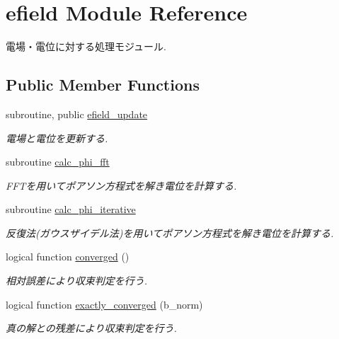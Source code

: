 \hypertarget{classefield}{\section{efield Module Reference}
\label{classefield}
}


電場・電位に対する処理モジュール.  


\subsection*{Public Member Functions}
\begin{DoxyCompactItemize}
\item 
\hypertarget{classefield_aa3e1da626e85f46b666ff7edf547aea5}{subroutine, public \hyperlink{classefield_aa3e1da626e85f46b666ff7edf547aea5}{efield\-\_\-update}}\label{classefield_aa3e1da626e85f46b666ff7edf547aea5}

\begin{DoxyCompactList}\small\item\em 電場と電位を更新する. \end{DoxyCompactList}\item 
\hypertarget{classefield_ac528cd9ba637bdbf306ab48e7d26b5af}{subroutine \hyperlink{classefield_ac528cd9ba637bdbf306ab48e7d26b5af}{calc\-\_\-phi\-\_\-fft}}\label{classefield_ac528cd9ba637bdbf306ab48e7d26b5af}

\begin{DoxyCompactList}\small\item\em F\-F\-Tを用いてポアソン方程式を解き電位を計算する. \end{DoxyCompactList}\item 
\hypertarget{classefield_af48fa06ec24555e895440abc8eb8e75a}{subroutine \hyperlink{classefield_af48fa06ec24555e895440abc8eb8e75a}{calc\-\_\-phi\-\_\-iterative}}\label{classefield_af48fa06ec24555e895440abc8eb8e75a}

\begin{DoxyCompactList}\small\item\em 反復法(ガウスザイデル法)を用いてポアソン方程式を解き電位を計算する. \end{DoxyCompactList}\item 
\hypertarget{classefield_a7b376693279756bd81a45ef990906b93}{logical function \hyperlink{classefield_a7b376693279756bd81a45ef990906b93}{converged} ()}\label{classefield_a7b376693279756bd81a45ef990906b93}

\begin{DoxyCompactList}\small\item\em 相対誤差により収束判定を行う. \end{DoxyCompactList}\item 
logical function \hyperlink{classefield_a124c572d4ce31325ed92daaf6b8a83d6}{exactly\-\_\-converged} (b\-\_\-norm)
\begin{DoxyCompactList}\small\item\em 真の解との残差により収束判定を行う. \end{DoxyCompactList}\end{DoxyCompactItemize}


